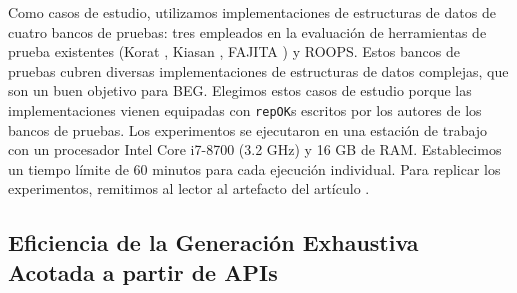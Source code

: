 Como casos de estudio, utilizamos implementaciones de estructuras de datos de cuatro bancos de pruebas: tres empleados en la evaluación de herramientas de prueba existentes (\textsf{Korat} \cite{Boyapati02}, \textsf{Kiasan} \cite{Deng06}, \textsf{FAJITA} \cite{Abad13}) y \textsf{ROOPS}. Estos bancos de pruebas cubren diversas implementaciones de estructuras de datos complejas, que son un buen objetivo para BEG. Elegimos estos casos de estudio porque las implementaciones vienen equipadas con \texttt{repOK}s escritos por los autores de los bancos de pruebas. Los experimentos se ejecutaron en una estación de trabajo con un procesador Intel Core i7-8700 (3.2 GHz) y 16 GB de RAM. Establecimos un tiempo límite de 60 minutos para cada ejecución individual. Para replicar los experimentos, remitimos al lector al artefacto del artículo \cite{artifact}.

\subsection{Eficiencia de la Generación Exhaustiva Acotada a partir de APIs}\label{sec:evaluation-vs-korat}


